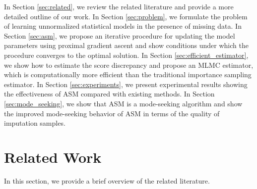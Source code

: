 In Section \ref{sec:related}, we review the related literature and provide a more detailed outline of our work. In Section \ref{sec:problem}, we formulate the problem of learning unnormalized statistical models in the presence of missing data. In Section \ref{sec:asm}, we propose an iterative procedure for updating the model parameters using proximal gradient ascent and show conditions under which the procedure converges to the optimal solution. In Section \ref{sec:efficient_estimator}, we show how to estimate the score discrepancy and propose an MLMC estimator, which is computationally more efficient than the traditional importance sampling estimator. In Section \ref{sec:experiments}, we present experimental results showing the effectiveness of ASM compared with existing methods. In Section \ref{sec:mode_seeking}, we show that ASM is a mode-seeking algorithm and show the improved mode-seeking behavior of ASM in terms of the quality of imputation samples.


\section{Related Work}

In this section, we provide a brief overview of the related literature.

